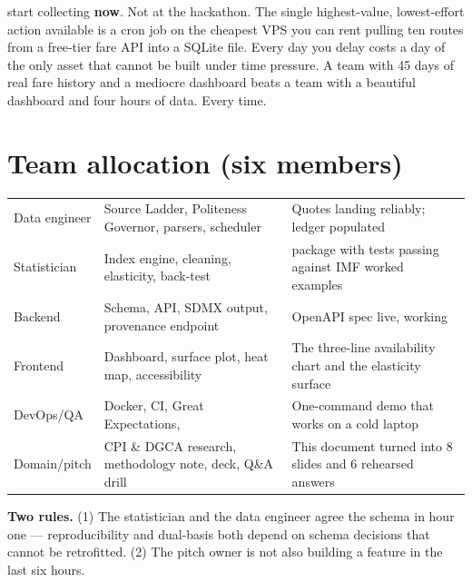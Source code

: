 \begin{redbox}
 start
collecting \textbf{now}. Not at the hackathon. The single highest-value, lowest-effort
action available is a cron job on the cheapest VPS you can rent pulling ten routes from a free-tier
fare API into a SQLite file. Every day you delay costs a day of the only asset that cannot
be built under time pressure. A team with 45 days of real fare history and a mediocre
dashboard beats a team with a beautiful dashboard and four hours of data. Every time.
\end{redbox}

\section{Team allocation (six members)}

\begin{center}
\footnotesize
\begin{tabularx}{\textwidth}{@{}L{2.6cm} L{3.4cm} X@{}}
\toprule
{} &  &  \\
\midrule
Data engineer & Source Ladder, Politeness Governor, parsers, scheduler & Quotes landing reliably; ledger populated \\
Statistician & Index engine, cleaning, elasticity, back-test &  package with tests passing against IMF worked examples \\
Backend & Schema, API, SDMX output, provenance endpoint & OpenAPI spec live,  working \\
Frontend & Dashboard, surface plot, heat map, accessibility & The three-line availability chart and the elasticity surface \\
DevOps/QA & Docker, CI, Great Expectations,  & One-command demo that works on a cold laptop \\
Domain/pitch & CPI \& DGCA research, methodology note, deck, Q\&A drill & This document turned into 8 slides and 6 rehearsed answers \\
\bottomrule
\end{tabularx}
\end{center}

\noindent \textbf{Two rules.} (1) The statistician and the data engineer agree the schema in
hour one --- reproducibility and dual-basis both depend on schema decisions that cannot be
retrofitted. (2) The pitch owner is not also building a feature in the last six hours.

